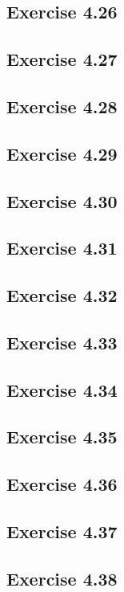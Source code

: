 \documentclass[../Marcus.tex]{subfiles}
\begin{document}
\subsection*{Exercise 4.26}

\subsection*{Exercise 4.27}

\subsection*{Exercise 4.28}

\subsection*{Exercise 4.29}

\subsection*{Exercise 4.30}

\subsection*{Exercise 4.31}

\subsection*{Exercise 4.32}

\subsection*{Exercise 4.33}

\subsection*{Exercise 4.34}

\subsection*{Exercise 4.35}

\subsection*{Exercise 4.36}

\subsection*{Exercise 4.37}

\subsection*{Exercise 4.38}
\phantom{}
\end{document}
